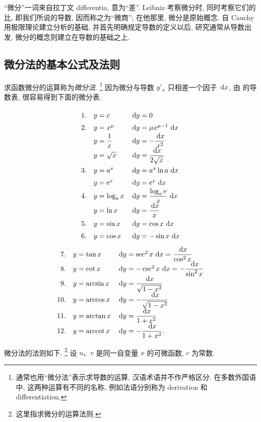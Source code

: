 “微分”一词来自拉丁文 differentia, 意为“差”.
Leibniz 考察微分时, 同时考察它们的比, 即我们所说的导数, 因而称之为“微商”;
在他那里, 微分是原始概念.
自 Cauchy 用极限理论建立分析的基础, 并首先明确规定导数的定义以后,
研究通常从导数出发, 微分的概念则建立在导数的基础之上.

\subsection{微分法的基本公式及法则}\label{subsec:105}
求函数微分的运算称为\emph{微分法}.
\footnote{通常也用“微分法”表示求导数的运算, 汉语术语并不作严格区分.
在多数外国语中, 这两种运算有不同的名称, 例如法语分别称为 derivation 和 differentiation.}
因为微分与导数 $y'_x$ 只相差一个因子 $\,\mathrm{d} x$,
由  的导数表, 很容易得到下面的微分表.

\label{tab:elementary_differentials}
$$
\renewcommand{\arraystretch}{1.45}
\begin{array}{rlll}
1.&y=c&\d y=0\\
2.&y=x^\mu&\d y=\mu x^{\mu-1}\,\d x\\
&y=\dfrac1x&\d y=-\dfrac{\d x}{x^2}\\
&y=\sqrt{x}&\d y=\dfrac{\d x}{2\sqrt{x}}\\
3.&y=a^x&\d y=a^x\ln a\,\d x\\
&y=\e^x&\d y=\e^x\,\d x\\
4.&y=\log_a x&\d y=\dfrac{\log_a \e}{x}\,\d x\\
&y=\ln x&\d y=\dfrac{\d x}{x}\\
5.&y=\sin x&\d y=\cos x\,\d x\\
6.&y=\cos x&\d y=-\sin x\,\d x\\
\end{array}
$$
\newpage
$$
\renewcommand{\arraystretch}{1.45}
\begin{array}{rlll}
7.&y=\tan x&\d y=\sec^2x\,\d x=\dfrac{\d x}{\cos^2x}\\
8.&y=\cot x&\d y=-\csc^2x\,\d x=-\dfrac{\d x}{\sin^2x}\\
9.&y=\arcsin x&\d y=\dfrac{\d x}{\sqrt{1-x^2}}\\
10.&y=\arccos x&\d y=-\dfrac{\d x}{\sqrt{1-x^2}}\\
11.&y=\arctan x&\d y=\dfrac{\d x}{1+x^2}\\
12.&y=\operatorname{arccot}x&\d y=-\dfrac{\d x}{1+x^2}.
\end{array}
$$

微分法的法则如下.
\footnote{这里指求微分的运算法则.}
设 $u$、$v$ 是同一自变量 $x$ 的可微函数, $c$ 为常数.

